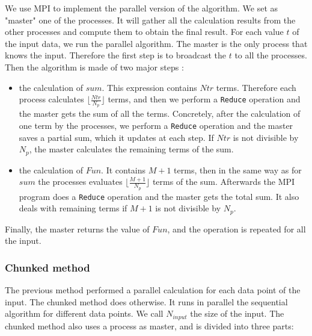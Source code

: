 \documentclass[11pt,a4paper]{article}
\begin{document}
We use MPI to implement the parallel version of the algorithm. We set as "master" one of the processes. It will gather all the calculation results from the other processes and compute them to obtain the final result. For each value $t$ of the input data, we run the parallel algorithm. The master is the only process that knows the input. Therefore the first step is to broadcast the $t$ to all the processes. Then the algorithm is made of two major steps :

\begin{itemize}

\item the calculation of $sum$. This expression contains $Ntr$ terms. Therefore each process calculates $\lfloor \frac{Ntr}{N_p}\rfloor$ terms, and then we perform a \verb_Reduce_ operation and the master gets the sum of all the terms. Concretely, after the calculation of one term by the processes, we perform a \verb_Reduce_ operation and the master saves a partial sum, which it updates at each step. If $Ntr$ is not divisible by $N_p$, the master calculates the remaining terms of the sum. 

\item the calculation of $Fun$. It contains $M+1$ terms, then in the same way as for $sum$ the processes evaluates $\lfloor \frac{M+1}{N_p}\rfloor$ terms of the sum. Afterwards the MPI program does a \verb_Reduce_ operation and the master gets the total sum. It also deals with remaining terms if $M+1$ is not divisible by $N_p$.

\end{itemize}

Finally, the master returns the value of $Fun$, and the operation is repeated for all the input. 

\subsubsection{Chunked method}
The previous method performed a parallel calculation for each data point of the input. The chunked method does otherwise. It runs in parallel the sequential algorithm for different data points. We call $N_{input}$ the size of the input. The chunked method also uses a process as master, and is divided into three parts: 
\end{document}
